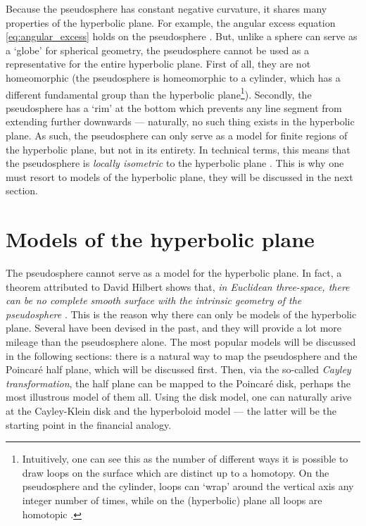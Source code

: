 Because the pseudosphere has constant negative curvature, it shares many properties of the hyperbolic plane. For example, the angular excess equation \cref{eq:angular_excess} holds on the pseudosphere \cite{Needham1997}. But, unlike a sphere can serve as a `globe' for spherical geometry, the pseudosphere cannot be used as a representative for the entire hyperbolic plane. First of all, they are not homeomorphic (the pseudosphere is homeomorphic to a cylinder, which has a different fundamental group than the hyperbolic plane\footnote{Intuitively, one can see this as the number of different ways it is possible to draw loops on the surface which are distinct up to a homotopy. On the pseudosphere and the cylinder, loops can `wrap' around the vertical axis any integer number of times, while on the (hyperbolic) plane all loops are homotopic \cite{Lee2000}.}). Secondly, the pseudosphere has a `rim' at the bottom which prevents any line segment from extending further downwards --- naturally, no such thing exists in the hyperbolic plane. As such, the pseudosphere can only serve as a model for finite regions of the hyperbolic plane, but not in its entirety. In technical terms, this means that the pseudosphere is \emph{locally isometric} to the hyperbolic plane \cite{Ghys2010}. This is why one must resort to models of the hyperbolic plane, they will be discussed in the next section.

\section{Models of the hyperbolic plane}
The pseudosphere cannot serve as a model for the hyperbolic plane. In fact, a theorem attributed to David Hilbert shows that, \emph{in Euclidean three-space, there can be no complete smooth surface with the intrinsic geometry of the pseudosphere} \cite{Thurston1997}. This is the reason why there can only be models of the hyperbolic plane. Several have been devised in the past, and they will provide a lot more mileage than the pseudosphere alone. The most popular models will be discussed in the following sections: there is a natural way to map the pseudosphere and the Poincaré half plane, which will be discussed first. Then, via the so-called \emph{Cayley transformation}, the half plane can be mapped to the Poincaré disk, perhaps the most illustrous model of them all. Using the disk model, one can naturally arive at the Cayley-Klein disk and the hyperboloid model --- the latter will be the starting point in the financial analogy.

